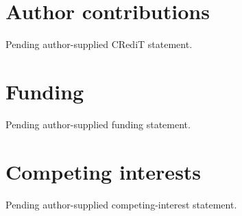 \section*{Author contributions}
Pending author-supplied CRediT statement.

\section*{Funding}
Pending author-supplied funding statement.

\section*{Competing interests}
Pending author-supplied competing-interest statement.
